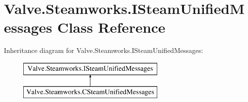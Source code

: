 \hypertarget{classValve_1_1Steamworks_1_1ISteamUnifiedMessages}{}\section{Valve.\+Steamworks.\+I\+Steam\+Unified\+Messages Class Reference}
\label{classValve_1_1Steamworks_1_1ISteamUnifiedMessages}
Inheritance diagram for Valve.\+Steamworks.\+I\+Steam\+Unified\+Messages\+:\begin{figure}[H]
\begin{center}
\leavevmode
\includegraphics[height=2.000000cm]{classValve_1_1Steamworks_1_1ISteamUnifiedMessages}
\end{center}
\end{figure}
